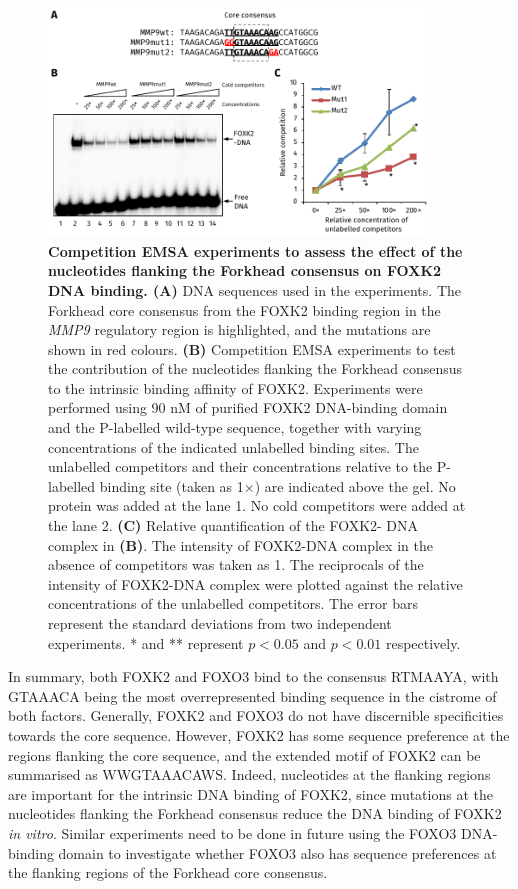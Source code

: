 \begin{figure}[!h]
    \centering
    \includegraphics[width=0.9\textwidth]{chapter3/figures_foxo3/fig47.pdf}
    \caption[Competition EMSA experiments to assess the effect of the nucleotides flanking the Forkhead consensus on FOXK2 DNA binding]{\textbf{Competition EMSA experiments to assess the effect of the nucleotides flanking the Forkhead consensus on FOXK2 DNA binding. (A)} DNA sequences used in the experiments. The Forkhead core consensus from the FOXK2 binding region in the \textit{MMP9} regulatory region is highlighted, and the mutations are shown in red colours. \textbf{(B)} Competition EMSA experiments to test the contribution of the nucleotides flanking the Forkhead consensus to the intrinsic binding affinity of FOXK2. Experiments were performed using 90 nM of purified FOXK2 DNA-binding domain and the P-labelled wild-type sequence, together with varying concentrations of the indicated unlabelled binding sites. The unlabelled competitors and their concentrations relative to the P-labelled binding site (taken as 1$\times$) are indicated above the gel. No protein was added at the lane 1. No cold competitors were added at the lane 2. \textbf{(C)} Relative quantification of the FOXK2- DNA complex in \textbf{(B)}. The intensity of FOXK2-DNA complex in the absence of competitors was taken as 1. The reciprocals of the intensity of FOXK2-DNA complex were plotted against the relative concentrations of the unlabelled competitors. The error bars represent the standard deviations from two independent experiments. * and ** represent $p<0.05$ and $p<0.01$ respectively.}
    \label{fig:fig47}
\end{figure}

In summary, both FOXK2 and FOXO3 bind to the consensus RTMAAYA, with GTAAACA being the most overrepresented binding sequence in the cistrome of both factors. Generally, FOXK2 and FOXO3 do not have discernible specificities towards the core sequence. However, FOXK2 has some sequence preference at the regions flanking the core sequence, and the extended motif of FOXK2 can be summarised as WWGTAAACAWS. Indeed, nucleotides at the flanking regions are important for the intrinsic DNA binding of FOXK2, since mutations at the nucleotides flanking the Forkhead consensus reduce the DNA binding of FOXK2 \textit{in vitro}. Similar experiments need to be done in future using the FOXO3 DNA-binding domain to investigate whether FOXO3 also has sequence preferences at the flanking regions of the Forkhead core consensus.

